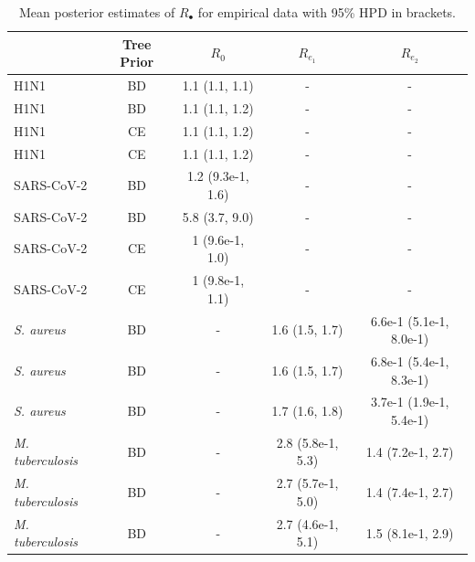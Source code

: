 \documentclass{article}
\begin{document}
\begin{table}[]
    \centering
    \caption{Mean posterior estimates of $R_{\bullet}$ for empirical data with 95\% HPD in brackets.}
    \begin{tabular}{lcccc}
    \toprule
     & Tree Prior & $R_0$ & $R_{e_1}$ & $R_{e_2}$\\
    \midrule
    H1N1 & BD & 1.1 (1.1, 1.1) & - & -\\
    H1N1 & BD & 1.1 (1.1, 1.2) & - & -\\
    \addlinespace
    H1N1 & CE & 1.1 (1.1, 1.2) & - & -\\
    H1N1 & CE & 1.1 (1.1, 1.2) & - & -\\
    \addlinespace
    SARS-CoV-2 & BD & 1.2 (9.3e-1, 1.6) & - & -\\
    SARS-CoV-2 & BD & 5.8 (3.7, 9.0) & - & -\\
    \addlinespace
    SARS-CoV-2 & CE & 1 (9.6e-1, 1.0) & - & -\\
    SARS-CoV-2 & CE & 1 (9.8e-1, 1.1) & - & -\\
    \addlinespace
    \textit{S. aureus} & BD & - & 1.6 (1.5, 1.7) & 6.6e-1 (5.1e-1, 8.0e-1)\\
    \textit{S. aureus} & BD & - & 1.6 (1.5, 1.7) & 6.8e-1 (5.4e-1, 8.3e-1)\\
    \textit{S. aureus} & BD & - & 1.7 (1.6, 1.8) & 3.7e-1 (1.9e-1, 5.4e-1)\\
    \addlinespace
    \textit{M. tuberculosis} & BD & - & 2.8 (5.8e-1, 5.3) & 1.4 (7.2e-1, 2.7)\\
    \textit{M. tuberculosis} & BD & - & 2.7 (5.7e-1, 5.0) & 1.4 (7.4e-1, 2.7)\\
    \textit{M. tuberculosis} & BD & - & 2.7 (4.6e-1, 5.1) & 1.5 (8.1e-1, 2.9)\\
    \bottomrule
    \end{tabular}

    \label{tab:emp-re}
\end{table}
\end{document}
